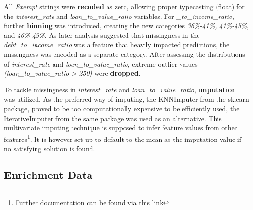 All \textit{Exempt} strings were \textbf{recoded} as zero, allowing proper typecasting (float) for the \textit{interest\_rate} and \textit{loan\_to\_value\_ratio} variables. 
For \textit{\_to\_income\_ratio}, further \textbf{binning} was introduced, creating the new categories \textit{36\%-41\%, 41\%-45\%}, and \textit{46\%-49\%}. %
As later analysis suggested that missingness in the \textit{debt\_to\_income\_ratio} was a feature that heavily impacted predictions, the missingness was encoded as a separate category.
After assessing the distributions of \textit{interest\_rate} and \textit{loan\_to\_value\_ratio}, extreme outlier values \textit{(loan\_to\_value\_ratio > 250)} were \textbf{dropped}. 

To tackle missingness in \textit{interest\_rate} and \textit{loan\_to\_value\_ratio}, \textbf{imputation} was utilized. 
As the preferred way of imputing, the KNNImputer from the sklearn package, proved to be too computationally expensive to be efficiently used, the IterativeImputer from the same package was used as an alternative. 
This multivariate imputing technique is supposed to infer feature values from other features\footnote{Further documentation can be found via \href{https://scikit-learn.org/stable/modules/generated/sklearn.impute.IterativeImputer.html}{this link}}. It is however set up to default to the mean as the imputation value if no satisfying solution is found.%

\subsection{Enrichment Data}\label{subsec:Enrichment_Data}

